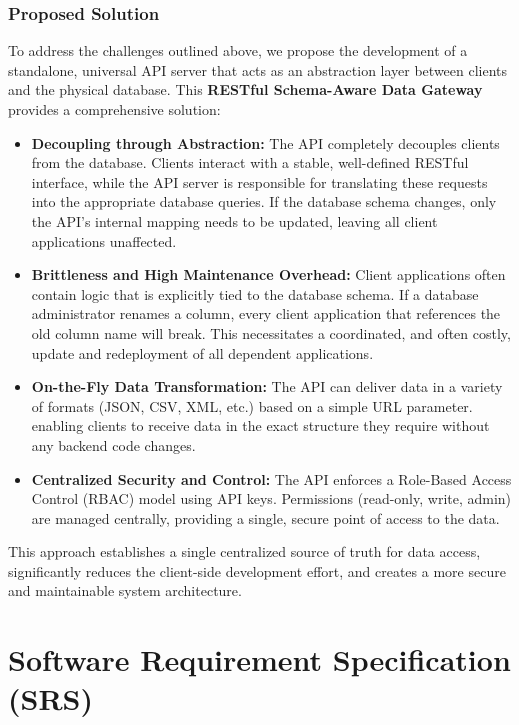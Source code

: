 \documentclass[12pt, a4paper]{report}
\begin{document}
\subsection{Proposed Solution}
To address the challenges outlined above, we propose the development of a standalone, universal API server that acts as an abstraction layer between clients and the physical database. This \textbf{RESTful Schema-Aware Data Gateway} provides a comprehensive solution:
\begin{itemize}
    \item \textbf{Decoupling through Abstraction:} The API completely decouples clients from the database. Clients interact with a stable, well-defined RESTful interface, while the API server is responsible for translating these requests into the appropriate database queries. If the database schema changes, only the API's internal mapping needs to be updated, leaving all client applications unaffected.
  \item \textbf{Brittleness and High Maintenance Overhead:} Client applications often contain logic that is explicitly tied to the database schema. If a database administrator renames a column, every client application that references the old column name will break. This necessitates a coordinated, and often costly, update and redeployment of all dependent applications.
    \item \textbf{On-the-Fly Data Transformation:} The API can deliver data in a variety of formats (JSON, CSV, XML, etc.) based on a simple URL parameter.  enabling clients to receive data in the exact structure they require without any backend code changes.
    \item \textbf{Centralized Security and Control:} The API enforces a Role-Based Access Control (RBAC) model using API keys. Permissions (read-only, write, admin) are managed centrally, providing a single, secure point of access to the data.
\end{itemize}
This approach establishes a single centralized source of truth for data access, significantly reduces the client-side development effort, and creates a more secure and maintainable system architecture.

\chapter{Software Requirement Specification (SRS)}
\end{document}
